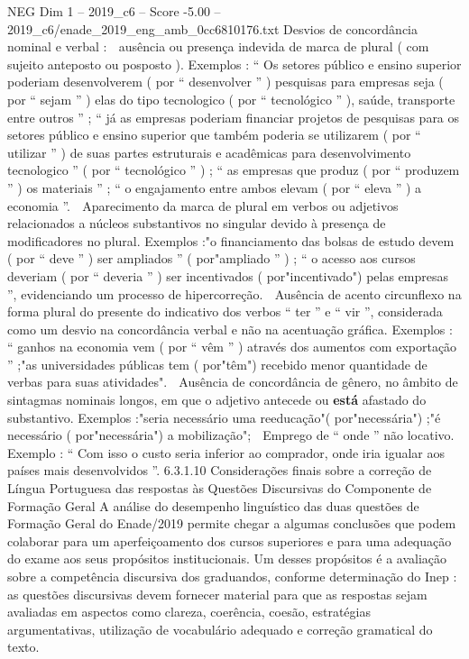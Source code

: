 \begin{textsample}{NEG Dim 1 – 2019\_c6 – Score -5.00 – 2019\_c6/enade\_2019\_eng\_amb\_0cc6810176.txt}
Desvios de concordância nominal e verbal :  ausência ou presença indevida de marca de plural ( com sujeito anteposto ou posposto ).
Exemplos : “ Os setores público e ensino superior poderiam desenvolverem ( por “ desenvolver ” ) pesquisas para empresas seja ( por “ sejam ” ) elas do tipo tecnologico ( por “ tecnológico ” ), saúde, transporte entre outros ” ; “ já as empresas poderiam financiar projetos de pesquisas para os setores público e ensino superior que também poderia se utilizarem ( por “ utilizar ” ) de suas partes estruturais e acadêmicas para desenvolvimento tecnologico ” ( por “ tecnológico ” ) ; “ as empresas que produz ( por “ produzem ” ) os materiais ” ; “ o engajamento entre ambos elevam ( por “ eleva ” ) a economia ”.  Aparecimento da marca de plural em verbos ou adjetivos relacionados a núcleos substantivos no singular devido à presença de modificadores no plural.
Exemplos :"o financiamento das bolsas de estudo devem ( por “ deve ” ) ser ampliados ” ( por"ampliado ” ) ; “ o acesso aos cursos deveriam ( por “ deveria ” ) ser incentivados ( por"incentivado") pelas empresas ”, evidenciando um processo de hipercorreção.  Ausência de acento circunflexo na forma plural do presente do indicativo dos verbos “ ter ” e “ vir ”, considerada como um desvio na concordância verbal e não na acentuação gráfica.
Exemplos : “ ganhos na economia vem ( por “ vêm ” ) através dos aumentos com exportação ” ;"as universidades públicas tem ( por"têm") recebido menor quantidade de verbas para suas atividades".  Ausência de concordância de gênero, no âmbito de sintagmas nominais longos, em que o adjetivo antecede ou \textbf{está} afastado do substantivo.
Exemplos :"seria necessário uma reeducação"( por"necessária") ;"é necessário ( por"necessária") a mobilização";  Emprego de “ onde ” não locativo.
Exemplo : “ Com isso o custo seria inferior ao comprador, onde iria igualar aos países mais desenvolvidos ”. 6.3.1.10 Considerações finais sobre a correção de Língua Portuguesa das respostas às Questões Discursivas do Componente de Formação Geral A análise do desempenho linguístico das duas questões de Formação Geral do Enade/2019 permite chegar a algumas conclusões que podem colaborar para um aperfeiçoamento dos cursos superiores e para uma adequação do exame aos seus propósitos institucionais.
Um desses propósitos é a avaliação sobre a competência discursiva dos graduandos, conforme determinação do Inep : as questões discursivas devem fornecer material para que as respostas sejam avaliadas em aspectos como clareza, coerência, coesão, estratégias argumentativas, utilização de vocabulário adequado e correção gramatical do texto.

\end{textsample}
